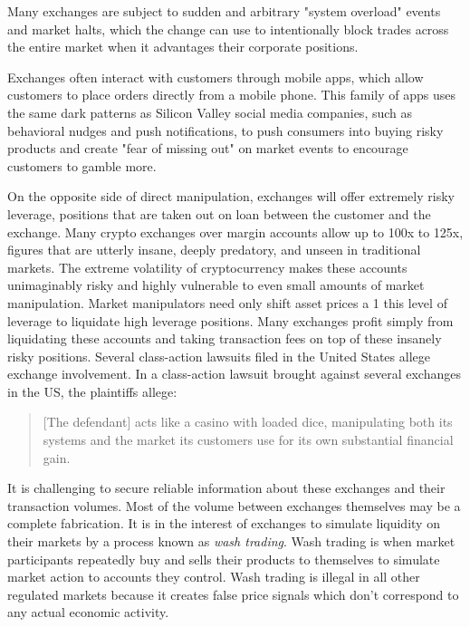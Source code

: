 Many exchanges are subject to sudden and arbitrary "system overload" events and
market halts, which the change can use to intentionally block trades across the
entire market when it advantages their corporate positions.
\cite{ostroff_binance_2021}

Exchanges often interact with customers through mobile apps, which allow
customers to place orders directly from a mobile phone. This family of apps uses
the same dark patterns as Silicon Valley social media companies, such as
behavioral nudges and push notifications, to push consumers into buying risky
products and create "fear of missing out" on market events to encourage
customers to gamble more.

On the opposite side of direct manipulation, exchanges will offer extremely
risky leverage, positions that are taken out on loan between the customer and
the exchange. Many crypto exchanges over margin accounts allow up to 100x to
125x, figures that are utterly insane, deeply predatory, and unseen in
traditional markets. The extreme volatility of cryptocurrency makes these
accounts unimaginably risky and highly vulnerable to even small amounts of
market manipulation. Market manipulators need only shift asset prices a 1%
this level of leverage to liquidate high leverage positions. Many exchanges
profit simply from liquidating these accounts and taking transaction fees on top
of these insanely risky positions. Several class-action lawsuits filed in the
United States allege exchange involvement. In a class-action lawsuit brought
against several exchanges in the US, the plaintiffs allege:

\begin{quote}
{[}The defendant{]} acts like a casino with loaded dice, manipulating
both its systems and the market its customers use for its own
substantial financial gain.
\end{quote}

It is challenging to secure reliable information about these exchanges and their
transaction volumes. Most of the volume between exchanges themselves may be a
complete fabrication. It is in the interest of exchanges to simulate liquidity
on their markets by a process known as \textit{wash trading}. Wash trading is when
market participants repeatedly buy and sells their products to themselves to
simulate market action to accounts they control. Wash trading is illegal in all
other regulated markets because it creates false price signals which don't
correspond to any actual economic activity.

